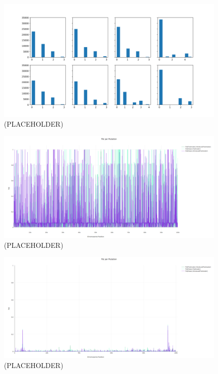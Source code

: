 \documentclass{article}
\begin{document}
\begin{figure}
	\begin{center}
  		\includegraphics[width=\linewidth]{matplotlibPlots/effectRegionCounts.png}
  		\caption{(PLACEHOLDER)}
		\label{fig:counts}
	\end{center}
\end{figure}

\begin{figure}[h!tb]
	\begin{center}
  		\includegraphics[width=0.7\linewidth]{plotlyPlots/FstAcross5e-5.png}
  		\caption{ (PLACEHOLDER)
		}
  		\label{fig:Fst1}
	\end{center}
\end{figure}

\begin{figure}[h!tb]
	\begin{center}
  		\includegraphics[width=0.7\linewidth]{plotlyPlots/FstAcross5e-2.png}
  		\caption{(PLACEHOLDER)
		}
  		\label{fig:Fst4}
	\end{center}
\end{figure}
\end{document}
